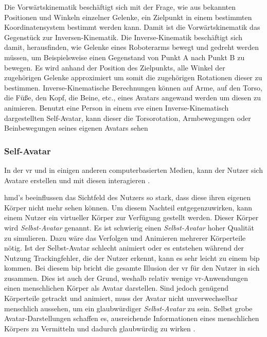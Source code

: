 \documentclass[a4paper,11pt]{article}%
\renewcommand{\\}{\vspace*{0.5\baselineskip} \newline}
\begin{document}
Die Vorwärtskinematik beschäftigt sich mit der Frage, wie aus bekannten Positionen und Winkeln einzelner Gelenke, ein Zielpunkt in einem bestimmten Koordinatensystem bestimmt werden kann. Damit ist die Vorwärtskinematik das Gegenstück zur Inversen-Kinematik. \citep[p.119]{kucuk2006robot}
\label{inverseKinematik}
Die Inverse-Kinematik beschäftigt sich damit, herausfinden, wie Gelenke eines Roboterarms bewegt und gedreht werden müssen, um Beispielsweise einen Gegenstand von Punkt A nach Punkt B zu bewegen. Es wird anhand der Position des Zielpunkts, alle Winkel der zugehörigen Gelenke approximiert um somit die zugehörigen Rotationen dieser zu bestimmen. \citep[p.299-300]{d2001learning} Inverse-Kinematische Berechnungen können auf Arme, auf den Torso, die Füße, den Kopf, die Beine, etc., eines Avatars angewand werden um diesen zu animieren. Benutzt eine Person in einem \ac{sve} einen Inverse-Kinematisch dargestellten Self-Avatar, kann dieser die Torsorotation, Armbewegungen oder Beinbewegungen seines eigenen Avatars sehen \citep[p.1]{kim2018real}

\subsubsection{Self-Avatar}

In der \ac{vr} und in einigen anderen computerbasierten Medien, kann der Nutzer sich Avatare erstellen und mit diesen interagieren \citep[p.1]{neustaedter2009presenting}.

\ac{hmd}'s beeinflussen das Sichtfeld des Nutzers so stark, dass diese ihren eigenen Körper nicht mehr sehen können. Um diesem Nachteil entgegenzuwirken, kann einem Nutzer ein virtueller Körper zur Verfügung gestellt werden. Dieser Körper wird \textit{Selbst-Avatar} genannt.
Es ist schwierig einen \textit{Selbst-Avatar} hoher Qualität zu simulieren. Dazu wäre das Verfolgen und Animieren mehrerer Körperteile nötig. Ist der Selbst-Avatar schlecht animiert oder es entstehen während der Nutzung Trackingfehler, die der Nutzer erkennt, kann es sehr leicht zu einem \ac{bip} kommen. Bei diesem \ac{bip} bricht die gesamte Illusion der \ac{vr} für den Nutzer in sich zusammen. 
Dies ist auch der Grund, weshalb relativ wenige \ac{vr}-Anwendungen einen menschlichen Körper als Avatar darstellen.
Sind jedoch genügend Körperteile getrackt und animiert, muss der Avatar nicht unverwechselbar menschlich aussehen, um ein glaubwürdiger \textit{Selbst-Avatar} zu sein. Selbst grobe Avatar-Darstellungen schaffen es, ausreichende Informationen eines menschlichen Körpers zu Vermitteln und dadurch glaubwürdig zu wirken \citep{lok2003effects}.
\end{document}
